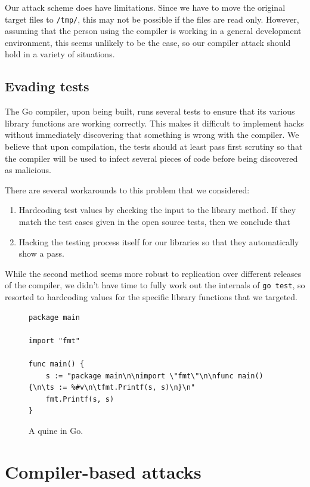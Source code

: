 \documentclass[10pt]{sigplanconf}
\begin{document}
\smallskip

Our attack scheme does have limitations. Since we have to move the original target files to \texttt{/tmp/}, this may not be possible if the files are read only. However, assuming that the person using the compiler is working in a general development environment, this seems unlikely to be the case, so our compiler attack should hold in a variety of situations. %

\subsection{Evading tests}

The Go compiler, upon being built, runs several tests to ensure that its various library functions are working correctly. This makes it difficult to implement hacks without immediately discovering that something is wrong with the compiler. We believe that upon compilation, the tests should at least pass first scrutiny so that the compiler will be used to infect several pieces of code before being discovered as malicious.

There are several workarounds to this problem that we considered:
\begin{enumerate}
\item Hardcoding test values by checking the input to the library method. If they match the test cases given in the open source tests, then we conclude that 
\item Hacking the testing process itself for our libraries so that they automatically show a pass.
\end{enumerate}

While the second method seems more robust to replication over different releases of the compiler, we didn't have time to fully work out the internals of \texttt{go test}, so resorted to hardcoding values for the specific library functions that we targeted.

\begin{figure}[t]
\begin{verbatim}
package main

import "fmt"

func main() {
    s := "package main\n\nimport \"fmt\"\n\nfunc main() {\n\ts := %#v\n\tfmt.Printf(s, s)\n}\n"
    fmt.Printf(s, s)
}
\end{verbatim}
\caption{A quine in Go.}
\label{fig:quine}
\end{figure}

\section{Compiler-based attacks}
\end{document}
